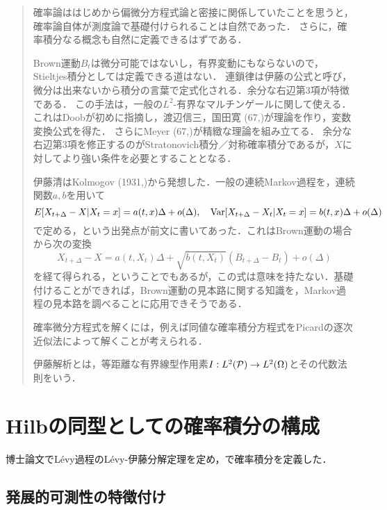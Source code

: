 \documentclass[uplatex,dvipdfmx]{jsreport}
\begin{document}
\begin{quotation}
    確率論ははじめから偏微分方程式論と密接に関係していたことを思うと，確率論自体が測度論で基礎付けられることは自然であった．
    さらに，確率積分なる概念も自然に定義できるはずである．

    Brown運動$B_t$は微分可能ではないし，有界変動にもならないので，Stieltjes積分としては定義できる道はない．
    連鎖律は伊藤の公式と呼び，微分は出来ないから積分の言葉で定式化される．余分な右辺第3項が特徴である．
    この手法は，一般の$L^2$-有界なマルチンゲールに関して使える．これはDoobが初めに指摘し，渡辺信三，国田寛 (67,\cite{KunitaWatanabe})が理論を作り，変数変換公式を得た．
    さらにMeyer (67,\cite{Meyer})が精緻な理論を組み立てる．
    余分な右辺第3項を修正するのがStratonovich積分／対称確率積分であるが，$X$に対してより強い条件を必要とすることとなる．

    伊藤清はKolmogov (1931,\cite{Kolmogorov31})から発想した．一般の連続Markov過程を，連続関数$a,b$を用いて
    \[E[X_{t+\Delta}-X|X_t=x]=a(t,x)\Delta+o(\Delta),\quad \mathrm{Var}[X_{t+\Delta}-X_t|X_t=x]=b(t,x)\Delta+o(\Delta)\]
    で定める，という出発点が前文に書いてあった．これはBrown運動の場合から次の変換
    \[X_{t+\Delta}-X=a(t,X_t)\Delta+\sqrt{b(t,X_t)}(B_{t+\Delta}-B_t)+o(\Delta)\]
    を経て得られる，ということでもあるが，この式は意味を持たない．基礎付けることができれば，Brown運動の見本路に関する知識を，Markov過程の見本路を調べることに応用できそうである．

    確率微分方程式を解くには，例えば同値な確率積分方程式をPicardの逐次近似法によって解くことが考えられる．

    伊藤解析とは，等距離な有界線型作用素$I:L^2(\mathcal{P})\to L^2(\Omega)$とその代数法則をいう．
\end{quotation}

\section{Hilbの同型としての確率積分の構成}

\begin{tcolorbox}[colframe=ForestGreen, colback=ForestGreen!10!white,breakable,colbacktitle=ForestGreen!40!white,coltitle=black,fonttitle=\bfseries\sffamily,
title=]
    博士論文\cite{Ito42}でLévy過程のLévy-伊藤分解定理を定め，\cite{Ito44}で確率積分を定義した．
\end{tcolorbox}

\subsection{発展的可測性の特徴付け}
\end{document}
